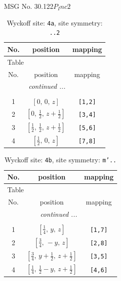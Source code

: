 \documentclass[fleqn,8pt]{jsarticle}
\begin{document}
\setcounter{MaxMatrixCols}{32}

\renewcommand{\tablename}{Table~}
\renewcommand{\figurename}{Figure~}
\begin{center}
\LARGE
MSG No. 30.122\quad$P_{I}nc2$
\end{center}
\renewcommand{\arraystretch}{1.2}
\begin{longtable}{ccc}
\caption{Wyckoff site: {\tt 4a}, site symmetry: {\tt ..2}}
 \\
 \hline \hline
No. & position & mapping \\ \hline \endfirsthead

\multicolumn{2}{l}{\tablename\ \thetable{}} \\
 \hline \hline
No. & position & mapping \\ \hline \endhead

 \hline \hline
\multicolumn{2}{r}{\footnotesize\it continued ...} \\ \endfoot

 \hline \hline
\multicolumn{2}{r}{} \\ \endlastfoot

1 & $\left[ 0,\, 0,\, z \right]$ & {\tt [1,2]} \\ \hline
2 & $\left[ 0,\, \frac{1}{2},\, z + \frac{1}{2} \right]$ & {\tt [3,4]} \\ \hline
3 & $\left[ \frac{1}{2},\, \frac{1}{2},\, z + \frac{1}{2} \right]$ & {\tt [5,6]} \\ \hline
4 & $\left[ \frac{1}{2},\, 0,\, z \right]$ & {\tt [7,8]} \\
\end{longtable}
\renewcommand{\arraystretch}{1.2}
\begin{longtable}{ccc}
\caption{Wyckoff site: {\tt 4b}, site symmetry: {\tt m'..}}
 \\
 \hline \hline
No. & position & mapping \\ \hline \endfirsthead

\multicolumn{2}{l}{\tablename\ \thetable{}} \\
 \hline \hline
No. & position & mapping \\ \hline \endhead

 \hline \hline
\multicolumn{2}{r}{\footnotesize\it continued ...} \\ \endfoot

 \hline \hline
\multicolumn{2}{r}{} \\ \endlastfoot

1 & $\left[ \frac{1}{4},\, y,\, z \right]$ & {\tt [1,7]} \\ \hline
2 & $\left[ \frac{3}{4},\, - y,\, z \right]$ & {\tt [2,8]} \\ \hline
3 & $\left[ \frac{3}{4},\, y + \frac{1}{2},\, z + \frac{1}{2} \right]$ & {\tt [3,5]} \\ \hline
4 & $\left[ \frac{1}{4},\, \frac{1}{2} - y,\, z + \frac{1}{2} \right]$ & {\tt [4,6]} \\
\end{longtable}
\end{document}
